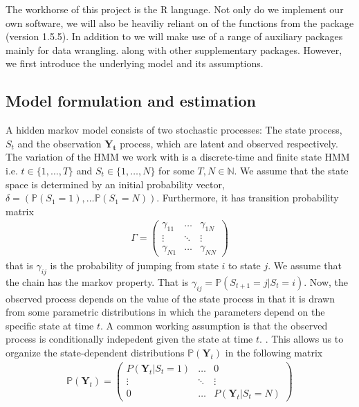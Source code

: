 The workhorse of this project is the R language.\cite{RLang}
Not only do we implement our own software, we will also be heaviliy reliant on of the functions from the package  \cite{momentuHMM} (version 1.5.5). In addition to  we will make use of a range of auxiliary packages mainly for data wrangling.\cite{tidyverse}\cite{Rcpp} along with other supplementary packages.\cite{gridExtra}\cite{microbenchmark}\cite{ggthemes}\cite{ggmap}\cite{mapview} However, we first introduce the underlying model and its assumptions.
\subsection{Model formulation and estimation}
A hidden markov model consists of two stochastic processes: The state process, $S_t$ and the observation $\mathbf{Y_t}$ process, which are latent and observed respectively. The variation of the HMM we work with is a discrete-time and finite state HMM i.e. $t\in\{1,\dots , T\}$ and $S_t\in\{1,\dots , N\}$ for some $T, N\in\mathbb{N}$. We assume that the state space is determined by an initial probability vector, $\delta = \left(\mathbb{P}(S_1 = 1),\dots \mathbb{P}(S_1 = N)\right)$. Furthermore, it has transition probability matrix
\begin{align}
    \Gamma = \begin{pmatrix}
        \gamma_{11} & \dots &  \gamma_{1N} \\
        \vdots & \ddots & \vdots \\
        \gamma_{N1} & \dots & \gamma_{NN}
    \end{pmatrix} \label{Gamma1}
\end{align}
that is $\gamma_{ij}$ is the probability of jumping from state $i$ to state $j$. We assume that the chain has the markov property. That is $\gamma_{ij} = \mathbb{P}\left(S_{t+1} = j | S_t = i\right)$. Now, the observed process depends on the value of the state process in that it is drawn from some parametric distributions in which the parameters depend on the specific state at time $t$.
A common working assumption is that the observed process is conditionally indepedent given the state at time $t$. 
\cite{UncoveringEcologicalState}. This allows us to organize the state-dependent distributions $\mathbb{P}(\mathbf{Y}_t)$ in the following matrix
\begin{align}
    \mathbb{P}(\mathbf{Y}_t) = \begin{pmatrix}
        P(\mathbf{Y}_t | S_t = 1) & \dots &  0 \\
        \vdots & \ddots & \vdots \\
        0 & \dots & P(\mathbf{Y}_t | S_t = N)
    \end{pmatrix}  
\end{align}
